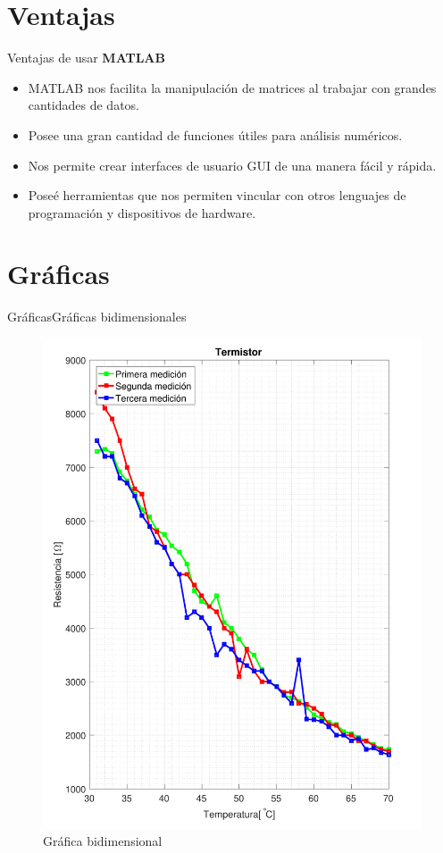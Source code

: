 \documentclass[10pt,xcolor={dvipsnames}]{beamer}
\begin{document}
\section {Ventajas}
\begin{frame}{Ventajas de usar \textbf{MATLAB}}{}
	\begin{itemize}
		\item MATLAB nos facilita la manipulación de matrices al trabajar con grandes cantidades de datos.
		\item Posee una gran cantidad de funciones útiles para análisis numéricos.
		\item Nos permite crear interfaces de usuario GUI de una manera fácil y rápida.
		\item Poseé herramientas que nos permiten vincular con otros lenguajes de programación y dispositivos de hardware. 
	\end{itemize}

\end{frame}
\section{Gráficas}
\begin{frame}{Gráficas}{Gráficas bidimensionales}
	\begin{figure}[ht]
		\includegraphics[scale=0.2]{img/termistor}
		\caption*{Gráfica bidimensional}
	\end{figure}

\end{frame}
\end{document}
